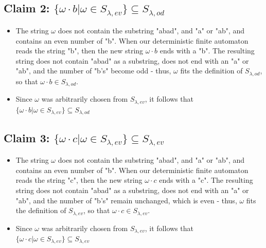 \documentclass{article}
\begin{document}
\subsection*{Claim 2: $\{\omega\cdot b|\omega\in S_{\lambda,ev}\} \subseteq S_{\lambda,od}$}
\begin{itemize}
    \item The string $\omega$ does not contain the substring "abad", and "a" or "ab", and contains an even number of "b". When our deterministic finite automaton reads the string "b", then 
    the new string $\omega\cdot b$ ends with a "b". The resulting string does not contain "abad" as a substring, does not end with an "a" or "ab", and the number of "b's" become odd - thus, $\omega$ fits the 
    definition of $S_{\lambda,od}$, so that $\omega\cdot b\in S_{\lambda,od}$. 
    \item Since $\omega$ was arbitrarily chosen from $S_{\lambda,ev}$, it follows that $\{\omega\cdot b|\omega\in S_{\lambda,ev}\}\subseteq S_{\lambda,od}$ 
\end{itemize}

\subsection*{Claim 3: $\{\omega\cdot c|\omega\in S_{\lambda,ev}\} \subseteq S_{\lambda,ev}$}
\begin{itemize}
    \item The string $\omega$ does not contain the substring "abad", and "a" or "ab", and contains an even number of "b". When our deterministic finite automaton reads the string "c", then 
    the new string $\omega\cdot c$ ends with a "c". The resulting string does not contain "abad" as a substring, does not end with an "a" or "ab", and the number of "b's" remain unchanged, which is even - 
    thus, $\omega$ fits the definition of $S_{\lambda,ev}$, so that $\omega\cdot c\in S_{\lambda,ev}$. 
    \item Since $\omega$ was arbitrarily chosen from $S_{\lambda,ev}$, it follows that $\{\omega\cdot c|\omega\in S_{\lambda,ev}\}\subseteq S_{\lambda,ev}$ 
\end{itemize}
\end{document}
